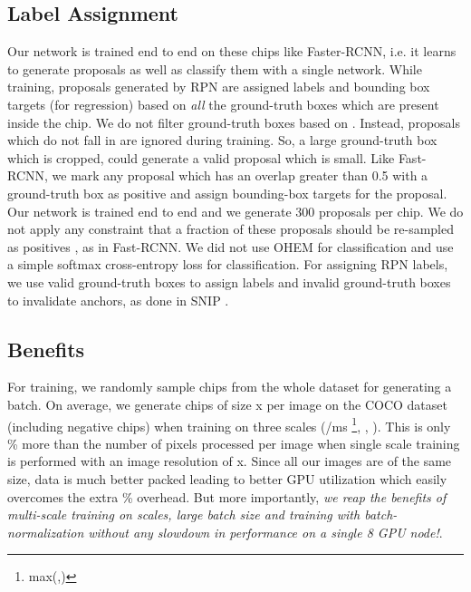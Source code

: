 \documentclass{article}
\begin{document}
\subsection{Label Assignment}
Our network is trained end to end on these chips like Faster-RCNN, i.e. it learns to generate proposals as well as classify them with a single network. While training, proposals generated by RPN are assigned labels and bounding box targets (for regression) based on {\em all} the ground-truth boxes which are present inside the chip. We do not filter ground-truth boxes based on . Instead, proposals which do not fall in  are ignored during training. So, a large ground-truth box which is cropped, could generate a valid proposal which is small. Like Fast-RCNN, we mark any proposal which has an overlap greater than 0.5 with a ground-truth box as positive and assign bounding-box targets for the proposal. Our network is trained end to end and we generate 300 proposals per chip. We do not apply any constraint that a fraction of these proposals should be re-sampled as positives \cite{ren2015faster}, as in Fast-RCNN. We did not use OHEM \cite{shrivastava2016training} for classification and use a simple softmax cross-entropy loss for classification. For assigning RPN labels, we use valid ground-truth boxes to assign labels and invalid ground-truth boxes to invalidate anchors, as done in SNIP \cite{singh2017analysis}. 

\subsection{Benefits}
For training, we randomly sample chips from the whole dataset for generating a batch. On average, we generate  chips of size x per image on the COCO dataset (including negative chips) when training on three scales (/ms \footnote{max(,)}, , ). This is only \% more than the number of pixels processed per image when single scale training is performed with an image resolution of x. Since all our images are of the same size, data is much better packed leading to better GPU utilization which easily overcomes the extra \% overhead. But more importantly, {\em we reap the benefits of multi-scale training on  scales, large batch size and training with batch-normalization without any slowdown in performance on a single 8 GPU node!}.
\end{document}
